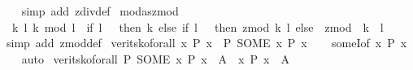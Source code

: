 \begin{isabellebody}
\ \ %
\endisadelimproof
%
\isatagproof
{}\isamarkupfalse%
\ {\isacharparenleft}{\kern0pt}simp\ add{\isacharcolon}{\kern0pt}\ z{}div{\isacharunderscore}{\kern0pt}def{\isacharparenright}{\kern0pt}%
\endisatagproof
{\isafoldproof}%
%
\isadelimproof
\isanewline
%
\endisadelimproof
\isanewline
{}\isamarkupfalse%
\ mod{\isacharunderscore}{\kern0pt}as{\isacharunderscore}{\kern0pt}z{}mod{\isacharcolon}{\kern0pt}\isanewline
\ \ {\isachardoublequoteopen}{\isasymforall}k\ l{\isachardot}{\kern0pt}\ k\ mod\ l\ {\isacharequal}{\kern0pt}\ {\isacharparenleft}{\kern0pt}if\ l\ {\isacharequal}{\kern0pt}\ {}\ then\ k\ else\ if\ l\ {\isachargreater}{\kern0pt}\ {}\ then\ z{}mod\ k\ l\ else\ {\isacharminus}{\kern0pt}\ z{}mod\ {\isacharparenleft}{\kern0pt}{\isacharminus}{\kern0pt}\ k{\isacharparenright}{\kern0pt}\ {\isacharparenleft}{\kern0pt}{\isacharminus}{\kern0pt}\ l{\isacharparenright}{\kern0pt}{\isacharparenright}{\kern0pt}{\isachardoublequoteclose}\isanewline
%
\isadelimproof
\ \ %
\endisadelimproof
%
\isatagproof
{}\isamarkupfalse%
\ {\isacharparenleft}{\kern0pt}simp\ add{\isacharcolon}{\kern0pt}\ z{}mod{\isacharunderscore}{\kern0pt}def{\isacharparenright}{\kern0pt}%
\endisatagproof
{\isafoldproof}%
%
\isadelimproof
%
\endisadelimproof
%
\isadelimdocument
%
\endisadelimdocument
%
\isatagdocument
%
\isamarkuptrue%
%
\endisatagdocument
{\isafolddocument}%
%
\isadelimdocument
%
\endisadelimdocument
{}\isamarkupfalse%
\ verit{\isacharunderscore}{\kern0pt}sko{\isacharunderscore}{\kern0pt}forall{\isacharcolon}{\kern0pt}\ {\isacartoucheopen}{\isacharparenleft}{\kern0pt}{\isasymforall}x{\isachardot}{\kern0pt}\ P\ x{\isacharparenright}{\kern0pt}\ {\isasymlongleftrightarrow}\ P\ {\isacharparenleft}{\kern0pt}SOME\ x{\isachardot}{\kern0pt}\ {\isasymnot}P\ x{\isacharparenright}{\kern0pt}{\isacartoucheclose}\isanewline
%
\isadelimproof
\ \ %
\endisadelimproof
%
\isatagproof
{}\isamarkupfalse%
\ someI{\isacharbrackleft}{\kern0pt}of\ {\isacartoucheopen}{\isasymlambda}x{\isachardot}{\kern0pt}\ {\isasymnot}P\ x{\isacartoucheclose}{\isacharbrackright}{\kern0pt}\isanewline
\ \ \isamarkupfalse%
\ auto%
\endisatagproof
{\isafoldproof}%
%
\isadelimproof
\isanewline
%
\endisadelimproof
\isanewline
{}\isamarkupfalse%
\ verit{\isacharunderscore}{\kern0pt}sko{\isacharunderscore}{\kern0pt}forall{\isacharprime}{\kern0pt}{\isacharcolon}{\kern0pt}\ {\isacartoucheopen}P\ {\isacharparenleft}{\kern0pt}SOME\ x{\isachardot}{\kern0pt}\ {\isasymnot}P\ x{\isacharparenright}{\kern0pt}\ {\isacharequal}{\kern0pt}\ A\ {\isasymLongrightarrow}\ {\isacharparenleft}{\kern0pt}{\isasymforall}x{\isachardot}{\kern0pt}\ P\ x{\isacharparenright}{\kern0pt}\ {\isacharequal}{\kern0pt}\ A{\isacartoucheclose}\isanewline

\end{isabellebody}
